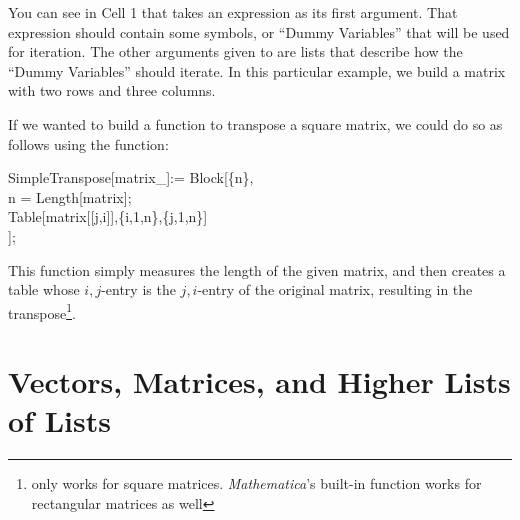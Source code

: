 You can see in Cell 1 that  takes an expression as its first argument. That expression should contain some symbols, or ``Dummy Variables'' that will be used for iteration. The other arguments given to  are lists that describe how the ``Dummy Variables'' should iterate. In this particular example, we build a matrix with two rows and three columns. 

If we wanted to build a function to transpose a square matrix, we could do so as follows using the  function:

\begin{code}
	   SimpleTranspose[matrix\_]:= Block[\{n\},\\
			 n = Length[matrix];\\
			 Table[matrix[[j,i]],\{i,1,n\},\{j,1,n\}]\\
	   ];
\end{code}

This function simply measures the length of the given matrix, and then creates a table whose $i,j$-entry is the $j,i$-entry of the original matrix, resulting in the transpose\footnote{ only works for square matrices. \emph{Mathematica}'s built-in  function works for rectangular matrices as well}.



\section{Vectors, Matrices, and Higher Lists of Lists}
